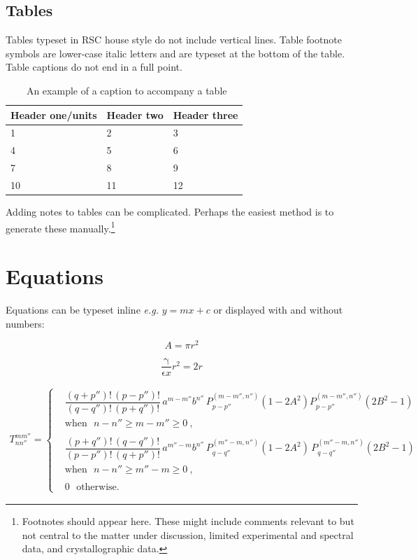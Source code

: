 \documentclass[twoside,twocolumn,9pt]{article}
\begin{document}
\subsection{Tables}
Tables typeset in RSC house style do not include vertical lines. Table footnote symbols are lower-case italic letters and are typeset at the bottom of the table. Table captions do not end in a full point.\cite{Arduengo1992,Eisenstein2005}


\begin{table}[h]
\small
  \caption{\ An example of a caption to accompany a table}
  \label{tbl:example}
  \begin{tabular*}{0.5\textwidth}{@{\extracolsep{\fill}}lll}
    \hline
    Header one/units & Header two & Header three \\
    \hline
    1 & 2 & 3 \\
    4 & 5 & 6 \\
    7 & 8 & 9 \\
    10 & 11 & 12 \\
    \hline
  \end{tabular*}
\end{table}

Adding notes to tables can be complicated.  Perhaps the easiest method is to generate these manually.\footnote[4]{Footnotes should appear here. These might include comments relevant to but not central to the matter under discussion, limited experimental and spectral data, and crystallographic data.}

\section{Equations}

Equations can be typeset inline \textit{e.g.} $ y = mx + c$ or displayed with and without numbers:

 \[ A = \pi r^2 \]

\begin{equation}
  \frac{\mathrm{\gamma}}{\mathrm{\epsilon}x} r^2 = 2r
\end{equation}
\pagebreak
\begin{widetext}
\begin{eqnarray} \label{e27}
T_{nn''}^{mm''}=
\begin{cases}
& \dfrac{(q{+}p'')!\,(p{-}p'')!}{(q{-}q'')!\,(p{+}q'')!}\,a^{m-m''}b^{n''}\,P_{p-p''}^{(m-m'',n'')}(1{-}2A^2)P_{p-p''}^{(m-m'',n'')}(2B^2{-}1)~~~ \\ & \text{when}~~~n-n''\geq m-m''\geq0~,\\
\\
& \dfrac{(p{+}q'')!\,(q{-}q'')!}{(p{-}p'')!\,(q{+}p'')!}\,a^{m''-m}b^{n''}\,P_{q-q''}^{(m''-m,n'')}(1{-}2A^2)\,P_{q-q''}^{(m''-m,n'')}(2B^2{-}1)~~~ \\ & \text{when}~~~ n-n''\geq m''-m\geq0~, \\
\\
&0 ~~~ \text{otherwise}.
\end{cases}
\end{eqnarray}
\end{widetext}
\end{document}
